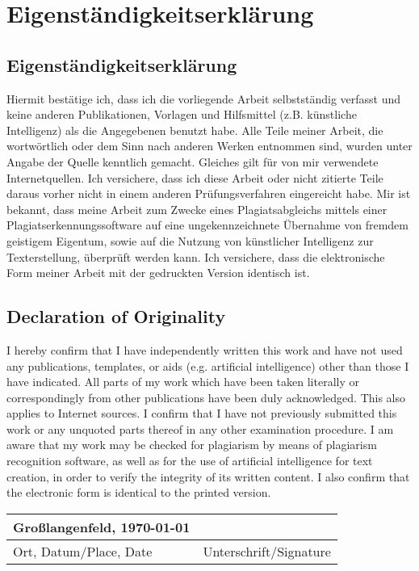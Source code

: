 \chapter{Eigenständigkeitserklärung}

\section*{Eigenständigkeitserklärung}
Hiermit bestätige ich, dass ich die vorliegende Arbeit selbstständig verfasst und keine 
anderen Publikationen, Vorlagen und Hilfsmittel (z.B. künstliche Intelligenz) als die 
Angegebenen benutzt habe. Alle Teile meiner Arbeit, die wortwörtlich oder dem Sinn nach 
anderen Werken entnommen sind, wurden unter Angabe der Quelle kenntlich gemacht. 
Gleiches gilt für von mir verwendete Internetquellen. Ich versichere, dass ich diese Arbeit 
oder nicht zitierte Teile daraus vorher nicht in einem anderen Prüfungsverfahren eingereicht 
habe. Mir ist bekannt, dass meine Arbeit zum Zwecke eines Plagiatsabgleichs mittels einer 
Plagiatserkennungssoftware auf eine ungekennzeichnete Übernahme von fremdem geistigem 
Eigentum, sowie auf die Nutzung von künstlicher Intelligenz zur Texterstellung, überprüft 
werden kann. Ich versichere, dass die elektronische Form meiner Arbeit mit der gedruckten 
Version identisch ist. \\

\section*{Declaration of Originality}
I hereby confirm that I have independently written this work and have not used any 
publications, templates, or aids (e.g. artificial intelligence) other than those I have 
indicated. All parts of my work which have been taken literally or correspondingly from other
publications have been duly acknowledged. This also applies to Internet sources. I confirm
that I have not previously submitted this work or any unquoted parts thereof in any other 
examination procedure. I am aware that my work may be checked for plagiarism by means 
of plagiarism recognition software, as well as for the use of artificial intelligence for text
creation, in order to verify the integrity of its written content. I also confirm that the 
electronic form is identical to the printed version. \\

\vspace{2cm}

\begin{center}
\begin{tabular}{p{}p{}}
    Großlangenfeld, \today & \\
    \hline
    Ort, Datum/Place, Date & Unterschrift/Signature \\
\end{tabular}
\end{center}